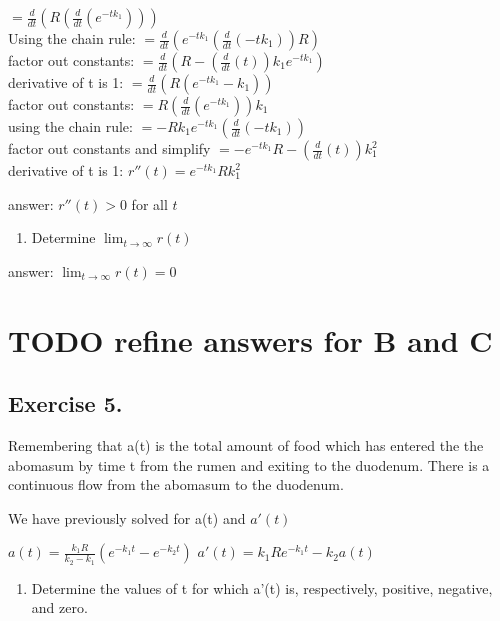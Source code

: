\documentclass[]{article}
\providecommand{\tightlist}{%
  \setlength{\itemsep}{0pt}\setlength{\parskip}{0pt}}
\begin{document}
\(= \frac{d}{dt}(R(\frac{d}{dt}(e^{-tk_1})))\)\\
Using the chain rule:
\(= \frac{d}{dt}(e^{-tk_1}(\frac{d}{dt}(-tk_1))R)\)\\
factor out constants:
\(= \frac{d}{dt}(R -(\frac{d}{dt}(t))k_1 e^{-tk_1})\)\\
derivative of t is 1: \(= \frac{d}{dt}(R(e^{-tk_1}-k_1))\)\\
factor out constants: \(= R(\frac{d}{dt}(e^{-tk_1}))k_1\)\\
using the chain rule: \(= -Rk_1e^{-tk_1}(\frac{d}{dt}(-tk_1))\)\\
factor out constants and simplify
\(= -e^{-tk_1}R-(\frac{d}{dt}(t))k_1^2\)\\
derivative of t is 1: \(r''(t)= e^{-tk_1}Rk_1^2\)

answer: \(r''(t) > 0\) for all \(t\)

\begin{enumerate}
\def\labelenumi{(\alph{enumi})}
\setcounter{enumi}{2}
\tightlist
\item
  Determine \(\lim_{t\to\infty}r(t)\)
\end{enumerate}

answer: \(\lim_{t\to\infty}r(t) =0\)

\section{TODO refine answers for B and
C}\label{todo-refine-answers-for-b-and-c}

\subsection{Exercise 5.}\label{exercise-5.}

Remembering that a(t) is the total amount of food which has entered the
the abomasum by time t from the rumen and exiting to the duodenum. There
is a continuous flow from the abomasum to the duodenum.

We have previously solved for a(t) and \(a'(t)\)

\(a(t) = \frac{k_1R}{k_2-k_1}(e^{-k_1t} - e^{-k_2t})\)
\(a'(t) = k_1Re^{-k_1t}-k_2a(t)\)

\begin{enumerate}
\def\labelenumi{(\alph{enumi})}
\tightlist
\item
  Determine the values of t for which a'(t) is, respectively, positive,
  negative, and zero.
\end{enumerate}
\end{document}
